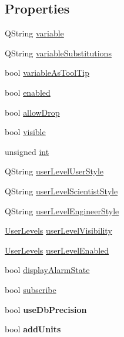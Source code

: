 \subsection*{Properties}
\begin{DoxyCompactItemize}
\item 
QString \hyperlink{classQESpinBox_ad3800174538dbb05744842b3f27c609a}{variable}
\item 
QString \hyperlink{classQESpinBox_a7acc6e65f3e878592545d782a7f75913}{variableSubstitutions}
\item 
bool \hyperlink{classQESpinBox_ac80ceeaecaaf4fb00b28318fa199c188}{variableAsToolTip}
\item 
bool \hyperlink{classQESpinBox_a3b294d83e54061c1cccb9a5dffcc0ae9}{enabled}
\item 
bool \hyperlink{classQESpinBox_a8c8b8104a0f53239e57c06bd4d39a1dd}{allowDrop}
\item 
bool \hyperlink{classQESpinBox_a478d53c589f3fc19a564641b16352555}{visible}
\item 
unsigned \hyperlink{classQESpinBox_aa205e7385b1f363dfb22541be9f9ba05}{int}
\item 
QString \hyperlink{classQESpinBox_aa367951d3e92c1959ce39b04dcf3e4fe}{userLevelUserStyle}
\item 
QString \hyperlink{classQESpinBox_a321df6a5a5d9eab84b1ce3fbe3bc0b9e}{userLevelScientistStyle}
\item 
QString \hyperlink{classQESpinBox_ae0832126a5745409e97eebbc96933956}{userLevelEngineerStyle}
\item 
\hyperlink{classQESpinBox_a27e69a31dc1ff8835542c057926b3eed}{UserLevels} \hyperlink{classQESpinBox_a36b8c4b73a3f918f967a45e370d53249}{userLevelVisibility}
\item 
\hyperlink{classQESpinBox_a27e69a31dc1ff8835542c057926b3eed}{UserLevels} \hyperlink{classQESpinBox_ab767d9e77fd21f19ad60ffc107f57253}{userLevelEnabled}
\item 
bool \hyperlink{classQESpinBox_a951a2bf579836bd159c9deb38a40f8a9}{displayAlarmState}
\item 
bool \hyperlink{classQESpinBox_a276dd7add074e7112181bce690f336f0}{subscribe}
\item 
\hypertarget{classQESpinBox_ad7f3a95bcf3f2ab22003d8430cfd0ae9}{
bool {\bfseries useDbPrecision}}
\label{classQESpinBox_ad7f3a95bcf3f2ab22003d8430cfd0ae9}

\item 
\hypertarget{classQESpinBox_a845f26efd0b12b2aef956f70829b66e8}{
bool {\bfseries addUnits}}
\label{classQESpinBox_a845f26efd0b12b2aef956f70829b66e8}

\end{DoxyCompactItemize}



